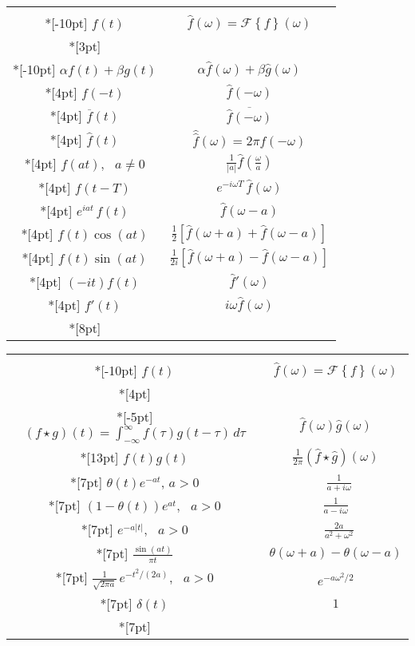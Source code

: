 \documentclass{article}
\newcommand\conj[1]{{\overline #1}}
\let\ob\conj
\def\Fourier#1{\mathcal F\left\{#1\right\}}
\let\FF\Fourier
\def\tfrac{\textstyle\frac}
\begin{document}
\begin{tabular}[t]{|c|c|}
 \hline & \\*[-10pt]
 $  f(t) $      & $ \widehat f(\omega) = \FF f(\omega) $ 
 \\*[3pt]\hline  & \\*[-10pt]
 $\alpha f(t)+\beta g(t)$ & $\alpha\widehat f(\omega) + \beta\widehat g(\omega)$ 
 \\*[4pt]
  $f(-t)$ & $\widehat f(-\omega)$
 \\*[4pt]
 $\ob f(t)$ & $\overline{\widehat f(-\omega)}$
 \\*[4pt]
 $\widehat f(t)$ & $\widehat{\widehat f}(\omega)=2\pi f(-\omega)$
 \\*[4pt]
 $f(at)$, \ $a\neq0$ & $\tfrac1{|a|} \widehat f(\tfrac\omega a)$
 \\*[4pt]
 $f(t-T)$ & $e^{-i\omega T}\,\widehat f(\omega)$
 \\*[4pt]
 $e^{iat}\,f(t)$ & $ \widehat f(\omega-a)$ 
 \\*[4pt]
 $f(t)\cos(at)$ & $ \tfrac12[\widehat f(\omega+a) + \widehat f(\omega-a)]$ 
 \\*[4pt]
 $f(t)\sin(at)$ & $ \tfrac1{2i}[\widehat f(\omega+a) - \widehat f(\omega-a)]$ 
 \\*[4pt]
 $(-it)f(t)$ & $\widehat f'(\omega)$ 
 \\*[4pt]
 $f'(t)$ & $i\omega\widehat f(\omega)$ 
 \\*[8pt]
 \hline
 \end{tabular}
 \hfil
\begin{tabular}[t]{|c|c|}
 \hline & \\*[-10pt]
 $  f(t) $      & $ \widehat  f(\omega) = \FF f(\omega) $ 
 \\*[4pt]\hline  & \\*[-5pt]
 $(f\star g)(t)=\int_{-\infty}^\infty f(\tau)g(t-\tau)\, d\tau$ & $\widehat f(\omega)\widehat g(\omega)$ 
 \\*[13pt]
 $f(t)g(t)$ & $\frac1{2\pi}(\widehat f\star\widehat g)(\omega)$
 \\*[7pt]
 $\theta(t)e^{-at}$, $a>0$ & \ $\frac1{a+i\omega}$
 \\*[7pt]
 $(1-\theta(t))e^{at}$, \ $a>0$ & $\frac1{a-i\omega}$
 \\*[7pt]
 $e^{-a|t|}$, \ $a>0$ & \ $\frac{2a}{a^2+\omega^2}$
 \\*[7pt]
 $\frac{\sin(at)}{\pi t}$ & $\theta(\omega+a)-\theta(\omega-a)$ 
 \\*[7pt]
 $\frac1{\sqrt{2\pi a}}\,e^{-t^2/(2a)}$, \ $a>0$ & $e^{-a\omega^2/2}$ 
 \\*[7pt]
 $\delta(t)$ & $1$ 
 \\*[7pt]
 \hline
\end{tabular}
\end{document}
